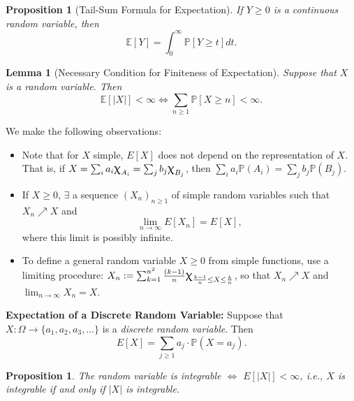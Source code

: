 \documentclass[12pt,reqno]{article}
\renewcommand{\emph}[1]{\textit{#1}}
\theoremstyle{plain}
\newtheorem{lemma}[theorem]{Lemma}
\newtheorem{prop}[theorem]{Proposition}
\theoremstyle{definition}
\newcommand{\PP}[1]{\ensuremath{\mathbb{P}\left(#1\right)}}
\renewcommand{\chi}{\scalebox{1.25}{$\upchi$}}
\begin{document}
\begin{prop}[Tail-Sum Formula for Expectation]
If $Y \geq 0$ is a continuous random variable, then 
\[
\mathbb{E}[Y] = \int_0^{\infty} \mathbb{P}[Y \geq t] dt. 
\]
\end{prop}

\begin{lemma}[Necessary Condition for Finiteness of Expectation]
Suppose that $X$ is a random variable. Then 
\[
\mathbb{E}[|X|] < \infty \iff \sum_{n \geq 1} \mathbb{P}[X \geq n] < \infty. 
\]
\end{lemma} 

We make the following observations: 
\begin{itemize} 

\item Note that for $X$ simple, $E[X]$ does not depend on the 
     representation of $X$. That is, if 
     $X = \sum_i a_i \chi_{A_i} = \sum_j b_j \chi_{B_j}$, then 
     $\sum_i a_i \mathbb{P}(A_i) = \sum_j b_j \mathbb{P}(B_j)$. 
\item If $X \geq 0$, $\exists$ a sequence $(X_n)_{n \geq 1}$ of simple 
     random variables such that $X_n \nearrow X$ and 
     \[
     \lim_{n \rightarrow \infty} E[X_n] = E[X], 
     \]
     where this limit is possibly infinite. 
\item To define a general random variable $X \geq 0$ from simple functions, 
     use a limiting procedure: 
     $X_n := \sum_{k=1}^{n^2} \frac{(k-1)}{n} 
      \chi_{\frac{k-1}{n} \leq X \leq \frac{k}{n}}$, so that 
     $X_n \nearrow X$ and $\lim_{n \rightarrow \infty} X_n = X$. 

\end{itemize} 
\textbf{Expectation of a Discrete Random Variable:} Suppose that 
$X: \Omega \rightarrow \{a_1,a_2,a_3,\ldots\}$ is a \emph{discrete random variable}. 
Then 
\[
E[X] = \sum_{j \geq 1} a_j \cdot \PP{X = a_j}. 
\]

\begin{prop}
The random variable is integrable $\iff$ $E[|X|] < \infty$, 
i.e., $X$ is integrable if and only if $|X|$ is integrable. 
\end{prop} 
\end{document}
